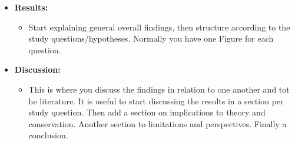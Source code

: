 \documentclass[
]{book}
\providecommand{\tightlist}{%
  \setlength{\itemsep}{0pt}\setlength{\parskip}{0pt}}
\begin{document}
\begin{itemize}
  \begin{itemize}
  \item
    must have one general, but small paragraph telling what was the
    main methodological approach.
  \item
    Then the methods must be structured in subsections. Typically,
    these are:

    \begin{itemize}
    \item
      ‚Study system' or ‚empirical data' if empirical or ‚Model
      description' is modelling manuscript (with many
      sub-subsections):

      \begin{itemize}
      \item
        For modeling papers, follow the ODD protocol
        \citep{grimm2010}
      \item
        It is also useful to document model development, mostly
        as Appendix, with a TRACE document \citep{grimm2014}
      \end{itemize}
    \item
      ‚Experimental design': this must explain what experiments
      were carrying out to answer i) all the questions; ii)
      particular questions. Normally you have one figure
      illustrating the scenarios.
    \item
      ‚Analyses': Start with a general paragraph explaining what
      model output you used for analyses, whether you did further
      calculations and manipulations for analyses that are
      relevant for all study questions. Thereafter, then follow
      the structure of the hypotheses and create one paragraph for
      study question and explain what analyses were carried out to
      answer explicitly each specific study question.
    \end{itemize}
  \end{itemize}
\item
  \textbf{Results:}

  \begin{itemize}
  \tightlist
  \item
    Start explaining general overall findings, then structure
    according to the study questions/hypotheses. Normally you have
    one Figure for each question.
  \end{itemize}
\item
  \textbf{Discussion:}

  \begin{itemize}
  \tightlist
  \item
    This is where you discuss the findings in relation to one
    another and tot he literature. It is useful to start discussing
    the results in a section per study question. Then add a section
    on implications to theory and conservation. Another section to
    limitations and perspectives. Finally a conclusion.
  \end{itemize}
\end{itemize}
\end{document}
